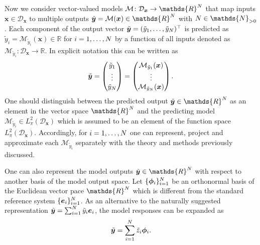 Now we consider vector-valued models \(\mathcal{M} \colon \mathcal{D}_{\bm{x}} \rightarrow \mathds{R}^\dimData\) that map inputs
\(\bm{x} \in \mathcal{D}_{\bm{x}}\) to multiple outputs \(\tilde{\bm{y}} = \mathcal{M}(\bm{x}) \in \mathds{R}^\dimData\) with \(\dimData \in \mathds{N}_{>0}\).
Each component of the output vector \(\tilde{\bm{y}} = (\tilde{y}_1,\ldots,\tilde{y}_N)^\top\)
is predicted as \(\tilde{y}_i = \mathcal{M}_{\tilde{y}_i}(\bm{x}) \in \mathds{R}\) for \(i=1,\ldots,N\)
by a function of all inputs denoted as \(\mathcal{M}_{\tilde{y}_i} \colon \mathcal{D}_{\bm{x}} \rightarrow \mathds{R}\).
In explicit notation this can be written as
\begin{equation} \label{eq:UQ:VectorModel}
  \tilde{\bm{y}}
  = \begin{pmatrix}
      \tilde{y}_1 \\
      \vdots \\
      \tilde{y}_N \\
    \end{pmatrix}
  = \begin{pmatrix}
      \mathcal{M}_{\tilde{y}_1}(\bm{x}) \\
      \vdots \\
      \mathcal{M}_{\tilde{y}_N}(\bm{x}) \\
    \end{pmatrix}.
\end{equation}
One should distinguish between the predicted output \(\tilde{\bm{y}} \in \mathds{R}^\dimData\) as an element in the vector space \(\mathds{R}^\dimData\)
and the predicting model \(\mathcal{M}_{\tilde{y}_i} \in L_{\pi}^2(\mathcal{D}_{\bm{x}})\) which is assumed to be an element of the function space \(L_{\pi}^2(\mathcal{D}_{\bm{x}})\).
Accordingly, for \(i=1,\ldots,N\) one can represent, project and approximate each \(\mathcal{M}_{\tilde{y}_i}\) separately with the theory and methods previously discussed.
\par %
One can also represent the model outputs \(\tilde{\bm{y}} \in \mathds{R}^\dimData\) with respect to another basis of the model output space.
Let \(\{\bm{\phi}_i\}_{i=1}^N\) be an orthonormal basis of the Euclidean vector pace \(\mathds{R}^\dimData\)
which is different from the standard reference system \(\{\bm{e}_i\}_{i=1}^N\).
As an alternative to the naturally suggested representation \(\tilde{\bm{y}} = \sum_{i=1}^N \tilde{y}_i \bm{e}_i\), the model responses can be expanded as
\begin{equation} \label{eq:UQ:ChangeOfBasis}
  \tilde{\bm{y}} = \sum\limits_{i=1}^N \tilde{z}_i \bm{\phi}_i.
\end{equation}
